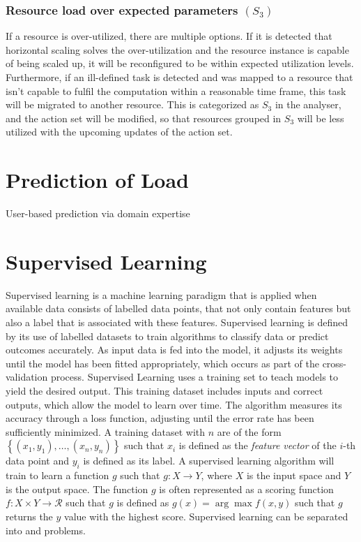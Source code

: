             \subsubsection*{Resource load over expected parameters $(S_3)$} 

            If a resource is over-utilized, there are multiple options. If it is detected that horizontal scaling solves the over-utilization and the resource instance is capable of being scaled up, it will be reconfigured to be within expected utilization levels. Furthermore, if an ill-defined task is detected and was mapped to a resource that isn't capable to fulfil the computation within a reasonable time frame, this task will be migrated to another resource. 
            This is categorized as $S_3$ in the analyser, and the action set will be modified, so that resources grouped in $S_3$ will be less utilized with the upcoming updates of the action set. \cite{kimovskiBigDataPipeline2022}



    \section{Prediction of Load}
    \label{sec:prediction-of-load-background}

        User-based prediction via domain expertise

    \section{Supervised Learning}
    \label{sec:supervised-learning}

        Supervised learning is a machine learning paradigm that is applied when available data consists of labelled data points, that not only contain features but also a label that is associated with these features.
        Supervised learning is defined by its use of labelled datasets to train algorithms to classify data or predict outcomes accurately.
        As input data is fed into the model, it adjusts its weights until the model has been fitted appropriately, which occurs as part of the cross-validation process.
        Supervised Learning uses a training set to teach models to yield the desired output.  
        This training dataset includes inputs and correct outputs, which allow the model to learn over time. The algorithm measures its accuracy through a loss function, adjusting until the error rate has been sufficiently minimized.
        A training dataset with $n$ are of the form $\left\{(x_1, y_1), \dots , (x_n, y_n)\right\}$ such that $x_i$ is defined as the \emph{feature vector} of the $i$-th data point and $y_i$ is defined as its label.
        A supervised learning algorithm will train to learn a function $g$ such that $g: X \rightarrow Y$, where $X$ is the input space and $Y$ is the output space.
        The function $g$ is often represented as a scoring function $f: X \times Y \rightarrow \mathcal{R}$ such that $g$ is defined as $g(x) = \arg \max f(x, y)$ such that $g$ returns the $y$ value with the highest score.
        Supervised learning can be separated into  and  problems.

